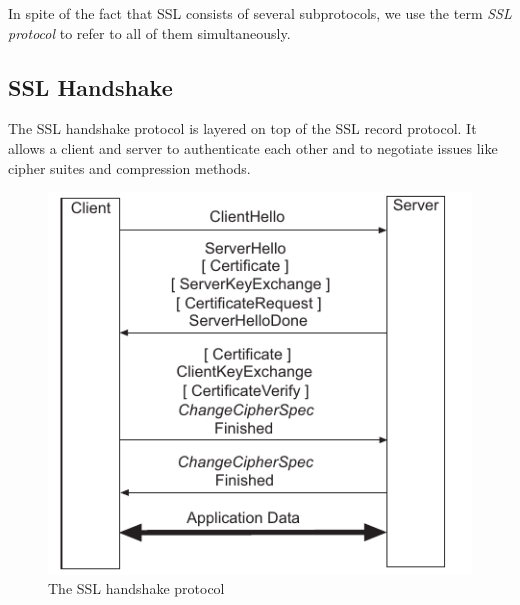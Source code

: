 \documentclass[a4paper,12pt]{article}
\begin{document}
In spite of the fact that SSL consists of several subprotocols, we use the term \emph{SSL protocol} to refer to all of them simultaneously.

\subsection{SSL Handshake}
The SSL handshake protocol is layered on top of the SSL record protocol. It allows a client and server to authenticate each other and to negotiate issues like cipher suites and compression methods.

\begin{figure}[H]
    \centering
    \includegraphics[scale=0.7]{handshake.png}
    \caption{The SSL handshake protocol}
    
\end{figure}
\end{document}
